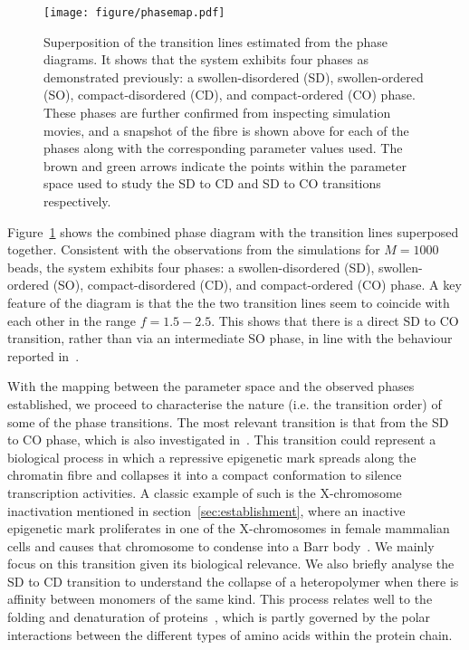 \documentclass[12pt]{article}
\newcommand*{\DataFig}{/Users/MichaelChiang/Desktop/epigenetics_data/}
\begin{document}
\begin{figure}[t]
\texttt{[image: figure/phasemap.pdf]}
\caption{Superposition of the transition lines estimated from the phase diagrams. It shows that the system exhibits four phases as demonstrated previously: a swollen-disordered (SD), swollen-ordered (SO), compact-disordered (CD), and compact-ordered (CO) phase. These phases are further confirmed from inspecting simulation movies, and a snapshot of the fibre is shown above for each of the phases along with the corresponding parameter values used. The brown and green arrows indicate the points within the parameter space used to study the SD to CD and SD to CO transitions respectively.}
\label{fig:phasemap}
\end{figure}

Figure~\ref{fig:phasemap} shows the combined phase diagram with the transition lines superposed together.  Consistent with the observations from the simulations for $M = 1000$ beads, the system exhibits four phases: a swollen-disordered (SD), swollen-ordered (SO), compact-disordered (CD), and compact-ordered (CO) phase. A key feature of the diagram is that the the two transition lines seem to coincide with each other in the range $f = 1.5 - 2.5$. This shows that there is a direct SD to CO transition, rather than via an intermediate SO phase, in line with the behaviour reported in~\cite{michieletto2016}. 

With the mapping between the parameter space and the observed phases established, we proceed to characterise the nature (i.e. the transition order) of some of the phase transitions. The most relevant transition is that from the SD to CO phase, which is also investigated in~\cite{michieletto2016}. This transition could represent a biological process in which a repressive epigenetic mark spreads along the chromatin fibre and collapses it into a compact conformation to silence transcription activities. A classic example of such is the X-chromosome inactivation mentioned in section~\ref{sec:establishment}, where an inactive epigenetic mark proliferates in one of the X-chromosomes in female mammalian cells and causes that chromosome to condense into a Barr body~\cite{avner2001}. We mainly focus on this transition given its biological relevance. We also briefly analyse the SD to CD transition to understand the collapse of a heteropolymer when there is affinity between monomers of the same kind. This process relates well to the folding and denaturation of proteins~\cite{}, which is partly governed by the polar interactions between the different types of amino acids within the protein chain.
\end{document}
